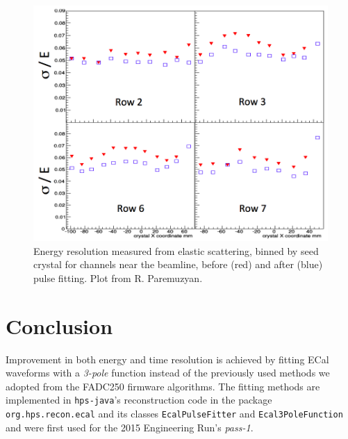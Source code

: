 \documentclass[amsmath,amssymb,notitlepage,12pt]{revtex4-1}
\begin{document}
\begin{figure}[htbp]\centering
  \includegraphics[width=12cm]{pics/feeReso.png}
  \caption{Energy resolution measured from elastic scattering, binned by seed crystal for channels near the beamline, before (red) and after (blue) pulse fitting.  Plot from R. Paremuzyan.\label{fig:feeReso}}
\end{figure}

\section{Conclusion}
Improvement in both energy and time resolution is achieved by fitting ECal waveforms with a {\em 3-pole} function instead of the previously used methods we adopted from the FADC250 firmware algorithms.  The fitting methods are implemented in \texttt{hps-java}'s reconstruction code in the package \texttt{org.hps.recon.ecal} and its classes \texttt{EcalPulseFitter} and \texttt{Ecal3PoleFunction} and were first used for the 2015 Engineering Run's {\em pass-1}. 


\end{document}
